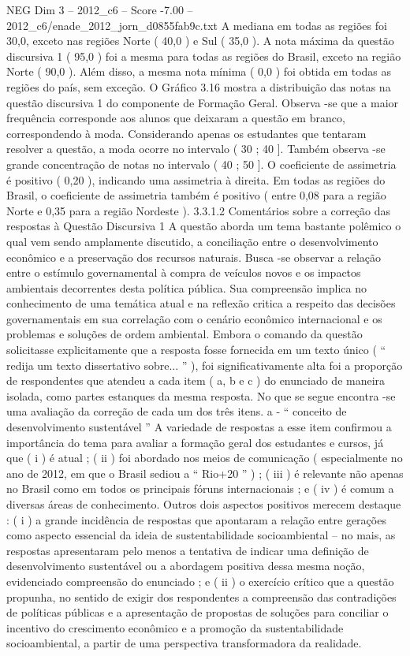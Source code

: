 \begin{textsample}{NEG Dim 3 – 2012\_c6 – Score -7.00 – 2012\_c6/enade\_2012\_jorn\_d0855fab9c.txt}
A mediana em todas as regiões foi 30,0, exceto nas regiões Norte ( 40,0 ) e Sul ( 35,0 ).
A nota máxima da questão discursiva 1 ( 95,0 ) foi a mesma para todas as regiões do Brasil, exceto na região Norte ( 90,0 ).
Além disso, a mesma nota mínima ( 0,0 ) foi obtida em todas as regiões do país, sem exceção.
O Gráfico 3.16 mostra a distribuição das notas na questão discursiva 1 do componente de Formação Geral.
Observa -se que a maior frequência corresponde aos alunos que deixaram a questão em branco, correspondendo à moda.
Considerando apenas os estudantes que tentaram resolver a questão, a moda ocorre no intervalo ( 30 ; 40 ].
Também observa -se grande concentração de notas no intervalo ( 40 ; 50 ].
O coeficiente de assimetria é positivo ( 0,20 ), indicando uma assimetria à direita.
Em todas as regiões do Brasil, o coeficiente de assimetria também é positivo ( entre 0,08 para a região Norte e 0,35 para a região Nordeste ). 3.3.1.2 Comentários sobre a correção das respostas à Questão Discursiva 1 A questão aborda um tema bastante polêmico o qual vem sendo amplamente discutido, a conciliação entre o desenvolvimento econômico e a preservação dos recursos naturais.
Busca -se observar a relação entre o estímulo governamental à compra de veículos novos e os impactos ambientais decorrentes desta política pública.
Sua compreensão implica no conhecimento de uma temática atual e na reflexão critica a respeito das decisões governamentais em sua correlação com o cenário econômico internacional e os problemas e soluções de ordem ambiental.
Embora o comando da questão solicitasse explicitamente que a resposta fosse fornecida em um texto único ( “ redija um texto dissertativo sobre... ” ), foi significativamente alta foi a proporção de respondentes que atendeu a cada item ( a, b e c ) do enunciado de maneira isolada, como partes estanques da mesma resposta.
No que se segue encontra -se uma avaliação da correção de cada um dos três itens. a - “ conceito de desenvolvimento sustentável ” A variedade de respostas a esse item confirmou a importância do tema para avaliar a formação geral dos estudantes e cursos, já que ( i ) é atual ; ( ii ) foi abordado nos meios de comunicação ( especialmente no ano de 2012, em que o Brasil sediou a “ Rio+20 ” ) ; ( iii ) é relevante não apenas no Brasil como em todos os principais fóruns internacionais ; e ( iv ) é comum a diversas áreas de conhecimento.
Outros dois aspectos positivos merecem destaque : ( i ) a grande incidência de respostas que apontaram a relação entre gerações como aspecto essencial da ideia de sustentabilidade socioambiental – no mais, as respostas apresentaram pelo menos a tentativa de indicar uma definição de desenvolvimento sustentável ou a abordagem positiva dessa mesma noção, evidenciado compreensão do enunciado ; e ( ii ) o exercício crítico que a questão propunha, no sentido de exigir dos respondentes a compreensão das contradições de políticas públicas e a apresentação de propostas de soluções para conciliar o incentivo do crescimento econômico e a promoção da sustentabilidade socioambiental, a partir de uma perspectiva transformadora da realidade.

\end{textsample}

